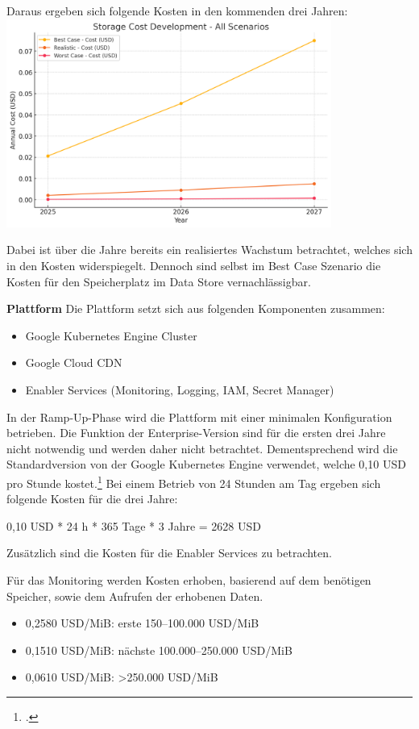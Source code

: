 Daraus ergeben sich folgende Kosten in den kommenden drei Jahren:
\includegraphics[width=0.8\textwidth]{abbildungen/Kosten_Speicher_Text}

Dabei ist über die Jahre bereits ein realisiertes Wachstum betrachtet, welches sich in den Kosten widerspiegelt.
Dennoch sind selbst im Best Case Szenario die Kosten für den Speicherplatz im Data Store vernachlässigbar.

\textbf{Plattform}\newline
Die Plattform setzt sich aus folgenden Komponenten zusammen:
\begin{itemize}
    \item Google Kubernetes Engine Cluster
    \item Google Cloud CDN
    \item Enabler Services (Monitoring, Logging, IAM, Secret Manager)
\end{itemize}

In der Ramp-Up-Phase wird die Plattform mit einer minimalen Konfiguration betrieben.
Die Funktion der Enterprise-Version sind für die ersten drei Jahre nicht notwendig und werden daher nicht betrachtet.
Dementsprechend wird die Standardversion von der Google Kubernetes Engine verwendet, welche 0,10 USD pro Stunde kostet.\footcite{GoogleKubernetesEnginePricing2025}
Bei einem Betrieb von 24 Stunden am Tag ergeben sich folgende Kosten für die drei Jahre:

0,10 USD * 24 h * 365 Tage * 3 Jahre = 2628 USD

Zusätzlich sind die Kosten für die Enabler Services zu betrachten.

Für das Monitoring werden Kosten erhoben, basierend auf dem benötigen Speicher, sowie dem Aufrufen der erhobenen Daten.

\begin{itemize}
    \item 0,2580 USD/MiB: erste 150–100.000 USD/MiB
    \item 0,1510 USD/MiB: nächste 100.000–250.000 USD/MiB
    \item 0,0610 USD/MiB: >250.000 USD/MiB
\end{itemize}

